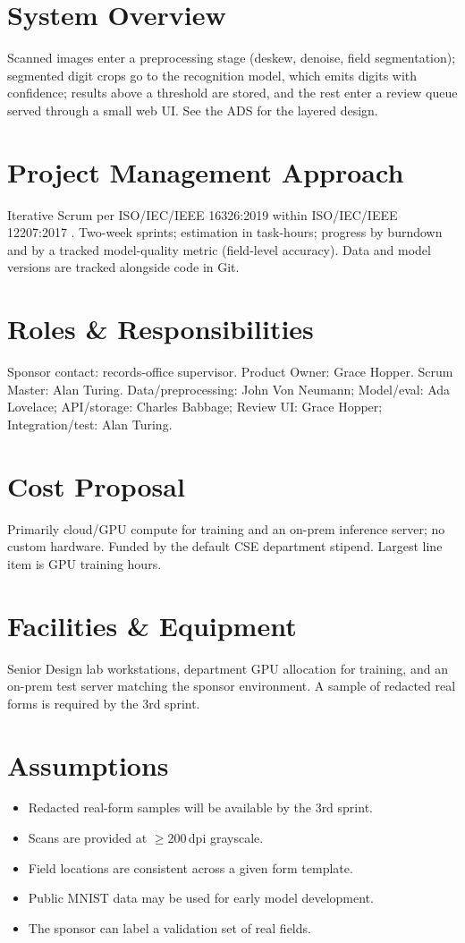 \documentclass[11pt,letterpaper]{article}
\begin{document}
\section{System Overview}
Scanned images enter a preprocessing stage (deskew, denoise, field segmentation);
segmented digit crops go to the recognition model, which emits digits with
confidence; results above a threshold are stored, and the rest enter a review queue
served through a small web UI. See the ADS for the layered design.

\section{Project Management Approach}
Iterative Scrum \cite{Rubin2012, SchwaberSutherland2020} per ISO/IEC/IEEE 16326:2019
\cite{ISO16326} within ISO/IEC/IEEE 12207:2017 \cite{ISO12207}. Two-week sprints;
estimation in task-hours; progress by burndown and by a tracked model-quality metric
(field-level accuracy). Data and model versions are tracked alongside code in Git.

\section{Roles \& Responsibilities}
Sponsor contact: records-office supervisor. Product Owner: Grace Hopper. Scrum
Master: Alan Turing. Data/preprocessing: John Von Neumann; Model/eval: Ada Lovelace;
API/storage: Charles Babbage; Review UI: Grace Hopper; Integration/test: Alan Turing.

\section{Cost Proposal}
Primarily cloud/GPU compute for training and an on-prem inference server; no custom
hardware. Funded by the default CSE department stipend. Largest line item is GPU
training hours.

\section{Facilities \& Equipment}
Senior Design lab workstations, department GPU allocation for training, and an
on-prem test server matching the sponsor environment. A sample of redacted real
forms is required by the 3rd sprint.

\section{Assumptions}
\begin{itemize}
  \item Redacted real-form samples will be available by the 3rd sprint.
  \item Scans are provided at $\geq$200\,dpi grayscale.
  \item Field locations are consistent across a given form template.
  \item Public MNIST data may be used for early model development.
  \item The sponsor can label a validation set of real fields.
\end{itemize}
\end{document}
